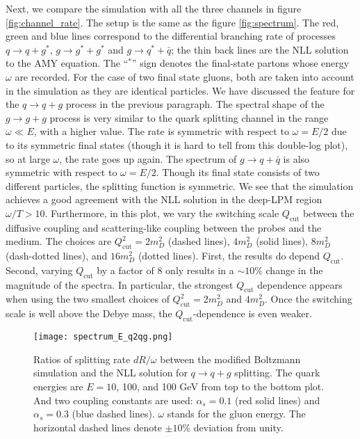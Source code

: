 Next, we compare the simulation with all the three channels in figure \ref{fig:channel_rate}.
The setup is the same as the figure \ref{fig:spectrum}.
The red, green and blue lines correspond to the differential branching rate of processes $q\rightarrow q+g^*$, $g\rightarrow g^*+g^*$ and $g\rightarrow q^*+\bar{q}$; the thin back lines are the NLL solution to the AMY equation.
The ``${}^*$'' sign denotes the final-state partons whose energy  $\omega$ are recorded.
For the case of two final state gluons, both are taken into account in the simulation as they are identical particles.
We have discussed the feature for the $q\rightarrow q+g$ process in the previous paragraph. 
The spectral shape of the $g\rightarrow g+g$ process is very similar to the quark splitting channel in the range $\omega \ll E$, with a higher value.
The rate is symmetric with respect to $\omega = E/2$ due to its symmetric final states (though it is hard to tell from this double-log plot), so at large $\omega$, the rate goes up again.
The spectrum of $g\rightarrow q+\bar{q}$ is also symmetric with respect to $\omega = E/2$. Though its final state consists of two different particles,  the splitting function is symmetric.
We see that the simulation achieves a good agreement with the NLL solution in the deep-LPM region $\omega/T > 10$.
Furthermore, in this plot, we vary the switching scale $Q_{\textrm{cut}}$ between the diffusive coupling and scattering-like coupling between the probes and the medium.
The choices are $Q_{\textrm{cut}}^2 = 2 m_D^2$ (dashed lines), $4 m_D^2$ (solid lines), $8 m_D^2$ (dash-dotted lines), and $16 m_D^2$ (dotted lines).
First, the results do depend $Q_{\textrm{cut}}$.
Second, varying $Q_{\textrm{cut}}$ by a factor of $8$ only results in a $\sim 10 \%$ change in the magnitude of the spectra.
In particular, the strongest $Q_{\textrm{cut}}$ dependence appears when using the two smallest choices of  $Q_{\textrm{cut}}^2 = 2 m_D^2$ and $4 m_D^2$.
Once the switching scale is well above the Debye mass, the $Q_{\textrm{cut}}$-dependence is even weaker.

\begin{figure}
\singlespacing
\centering
\texttt{[image: spectrum\_E\_q2qg.png]}
\caption[Ratios of splitting rate $dR/\omega$ between the modified Boltzmann]{Ratios of splitting rate $dR/\omega$ between the modified Boltzmann simulation and the NLL solution for $q\rightarrow q+g$ splitting. The quark energies are $E = 10$, 100, and 100 GeV from top to the bottom plot. 
And two coupling constants are used: $\alpha_s = 0.1$ (red solid lines) and $\alpha_s = 0.3$ (blue dashed lines).
$\omega$ stands for the gluon energy.
The horizontal dashed lines denote $\pm 10\%$ deviation from unity.}
\label{fig:sys-q2qg}
\end{figure}

